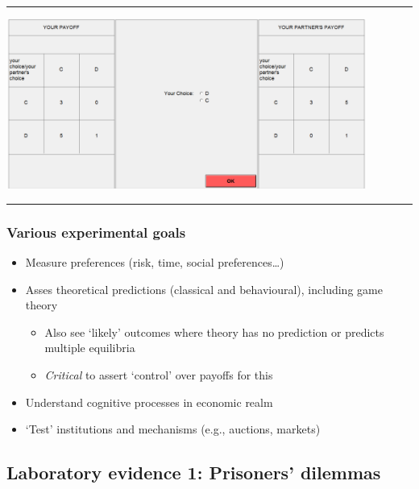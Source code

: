 \documentclass[]{article}
\providecommand{\tightlist}{%
  \setlength{\itemsep}{0pt}\setlength{\parskip}{0pt}}
\begin{document}
\begin{center}\rule{0.5\linewidth}{\linethickness}\end{center}

\includegraphics[height=2.2in]{picsfigs/ztreePD.png}

\begin{center}\rule{0.5\linewidth}{\linethickness}\end{center}

\hypertarget{various-experimental-goals}{%
\subsubsection{Various experimental
goals}\label{various-experimental-goals}}

\begin{itemize}
\tightlist
\item
  Measure preferences (risk, time, social preferences\ldots)
\item
  Asses theoretical predictions (classical and behavioural), including
  game theory

  \begin{itemize}
  \tightlist
  \item
    Also see `likely' outcomes where theory has no prediction or
    predicts multiple equilibria
  \item
    \emph{Critical} to assert `control' over payoffs for this
  \end{itemize}
\item
  Understand cognitive processes in economic realm
\item
  `Test' institutions and mechanisms (e.g., auctions, markets)
\end{itemize}

\hypertarget{laboratory-evidence-1-prisoners-dilemmas}{%
\subsection{Laboratory evidence 1: Prisoners'
dilemmas}\label{laboratory-evidence-1-prisoners-dilemmas}}
\end{document}
